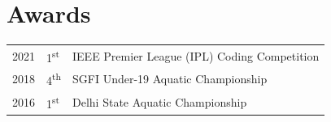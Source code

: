 \documentclass[]{deedy-resume-openfont}
\begin{document}
\begin{minipage}[t]{0.66\textwidth}
\section{Awards} 
\begin{tabular}{rll}
2021	     & 1\textsuperscript{st}  & IEEE Premier League (IPL) Coding Competition\\
2018	     & 4\textsuperscript{th}  & SGFI Under-19 Aquatic Championship\\
2016     & 1\textsuperscript{st} &  Delhi State Aquatic Championship\\
\end{tabular}
\sectionsep



\end{minipage} 
\end{document}
